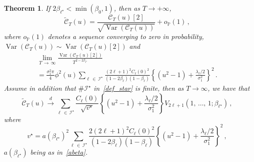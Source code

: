 \documentclass[10pt]{amsart}
\newtheorem{theo}{Theorem}[section]
\theoremstyle{definition}\newtheorem{defi}[theo]{Definition}\newtheorem{rema}[theo]{Remark}\newtheorem{exam}[theo]{Example}\newtheorem{exem}[theo]{Example}\newtheorem{nota}[theo]{Notation}
\newcommand{\clI}{\mathcal{I}}
\newcommand{\clC}{\mathcal{C}}
\newcommand{\bbP}{\mathbb{P}}
\DeclareMathOperator{\Var}{Var}
\begin{document}
\begin{theo}\label{main-theorem}
If $2\beta_{\ell^\star}<\min(\beta_0,1)$, then as $T\to +\infty$,
\begin{equation}\label{caos2dom}
\widetilde{\clC}_{T}(u) =\frac{\clC_{T}(u)[2]}{\sqrt{
\Var\left (\clC_{T}(u)\right) }}+o_{\bbP}(1)\,,
\end{equation}
where $o_{\bbP}(1)$ denotes a sequence converging to zero in probability, $\Var\left(\clC_{T}(u)\right) \sim
\Var\left(\clC_{T}(u)[2]\right)$ and
\begin{multline}\label{asymp_var}
\lim_{T\,\rightarrow\,\infty }\frac{\Var\left(\clC _{T}(u)[2]\right)}{T^{2-2\beta _{\ell^{\star}}}}\\
=\frac{\sigma _{1}^{2}\pi }{4}\phi^{2}(u)\sum_{\ell\,\in\,\clI^\star}\frac{(2\ell+1)^{2}C_
\ell(0)^2}{(1-2\beta_\ell)(1-\beta_\ell)}\left\{\left(u^{2}-1\right)+\frac{\lambda _{\ell}/2}{\sigma_{1}^{2}}\right\}^2\,.
\end{multline}
Assume in addition that $\# \clI^\star$ in~\eqref{def_star} is finite, then as $T\to \infty $, we have that
\begin{equation*}
\widetilde{\clC}_{T}(u)\overset{d}{\longrightarrow}\sum_{\ell\,\in\,\clI^\star} \frac{C_\ell(0)}{\sqrt{v^\star}}\left\{\left(u^{2}-1\right)+\frac{\lambda _{\ell}/2}{\sigma_{1}^{2}}\right\}V_{2\ell+1}\left(1,\,\dots,\,1;\beta_{\ell^\star}\right)\,,
\end{equation*}
where
\begin{equation*}
v^\star=a\left(\beta_{\ell^\star}\right)^2 \sum_{\ell\,\in\,\clI^\star} \frac{2(2\ell+1)^{2} C_\ell(0)^2}{(1-2\beta_\ell)(1-\beta_\ell)} \left\{ \left(u^{2}-1\right)+\frac{\lambda _{\ell}/2}{\sigma_{1}^{2}}\right\}^2\,,
\end{equation*}
$a(\beta_{\ell^\star})$ being as in~\eqref{abeta}.
\end{theo}
\end{document}
